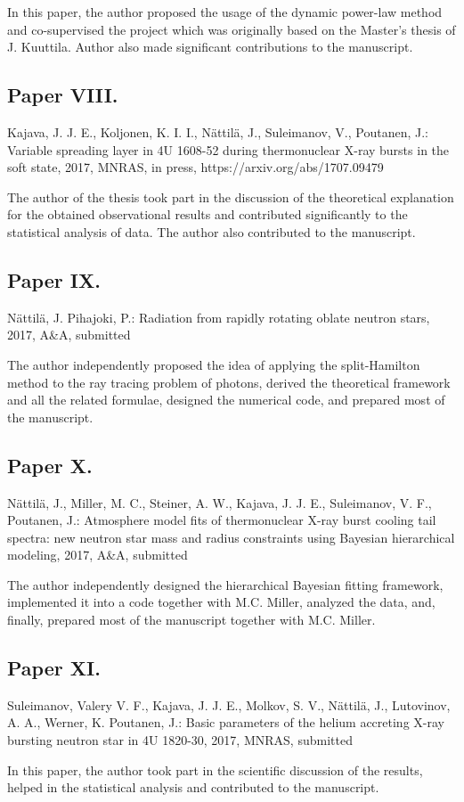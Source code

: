 In this paper, the author proposed the usage of the dynamic power-law method and co-supervised the project which was originally based on the Master's thesis of J. Kuuttila. 
Author also made significant contributions to the manuscript.


\subsection{Paper VIII.}
Kajava, J. J. E., Koljonen, K. I. I., Nättilä, J., Suleimanov, V., Poutanen, J.: Variable spreading layer in 4U 1608-52 during thermonuclear X-ray bursts in the soft state, 2017, MNRAS, in press, https://arxiv.org/abs/1707.09479

The author of the thesis took part in the discussion of the theoretical explanation for the obtained observational results and contributed significantly to the statistical analysis of data. 
The author also contributed to the manuscript.


\subsection{Paper IX.}
Nättilä, J. Pihajoki, P.: Radiation from rapidly rotating oblate neutron stars, 2017, A&A, submitted

The author independently proposed the idea of applying the split-Hamilton method to the ray tracing problem of photons, derived the theoretical framework and all the related formulae, designed the numerical code, and prepared most of the manuscript.


\subsection{Paper X.}
Nättilä, J., Miller, M. C., Steiner, A. W., Kajava, J. J. E., Suleimanov, V. F., Poutanen, J.: Atmosphere model fits of thermonuclear X-ray burst cooling tail spectra: new neutron star mass and radius constraints using Bayesian hierarchical modeling, 2017, A&A, submitted

The author independently designed the hierarchical Bayesian fitting framework, implemented it into a code together with M.C. Miller, analyzed the data, and, finally, prepared most of the manuscript together with M.C. Miller.


\subsection{Paper XI.}
Suleimanov, Valery V. F., Kajava, J. J. E., Molkov, S. V., Nättilä, J., Lutovinov, A. A., Werner, K. Poutanen, J.: Basic parameters of the helium accreting X-ray bursting neutron star in 4U 1820-30, 2017, MNRAS, submitted

In this paper, the author took part in the scientific discussion of the results, helped in the statistical analysis and contributed to the manuscript.


